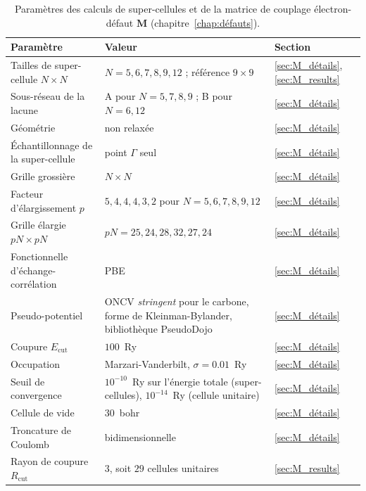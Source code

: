 \vspace*{\fill}
\begin{table}[htbp]
    \centering
    \caption[Paramètres des super-cellules et de la matrice $\bm M$.]{Paramètres des calculs de super-cellules et de la matrice de couplage électron-défaut $\bm M$ (chapitre~\ref{chap:défauts}).}
    \label{tab:param_M}
    \small
    \setlength{\tabcolsep}{4pt}
    \begin{tabular}{p{} p{} p{}}
        \hline\hline
        Paramètre & Valeur & Section \\
        \hline
        Tailles de super-cellule $N\times N$ & $N = 5, 6, 7, 8, 9, 12$ ; référence $9\times 9$ & \ref{sec:M_détails}, \ref{sec:M_results} \\
        Sous-réseau de la lacune & A pour $N = 5, 7, 8, 9$ ; B pour $N = 6, 12$ & \ref{sec:M_détails} \\
        Géométrie & non relaxée & \ref{sec:M_détails} \\
        Échantillonnage de la super-cellule & point $\Gamma$ seul & \ref{sec:M_détails} \\
        Grille grossière & $N\times N$ & \ref{sec:M_détails} \\
        Facteur d'élargissement $p$ & $5, 4, 4, 4, 3, 2$ pour $N = 5, 6, 7, 8, 9, 12$ & \ref{sec:M_détails} \\
        Grille élargie $pN\times pN$ & $pN = 25, 24, 28, 32, 27, 24$ & \ref{sec:M_détails} \\
        Fonctionnelle d'échange-corrélation & PBE & \ref{sec:M_détails} \\
        Pseudo-potentiel & ONCV \textit{stringent} pour le carbone, forme de Kleinman-Bylander, bibliothèque PseudoDojo & \ref{sec:M_détails} \\
        Coupure $E_\text{cut}$ & $100$~Ry & \ref{sec:M_détails} \\
        Occupation & Marzari-Vanderbilt, $\sigma = 0.01$~Ry & \ref{sec:M_détails} \\
        Seuil de convergence & $10^{-10}$~Ry sur l'énergie totale (super-cellules), $10^{-14}$~Ry (cellule unitaire) & \ref{sec:M_détails} \\
        Cellule de vide & $30$~bohr & \ref{sec:M_détails} \\
        Troncature de Coulomb & bidimensionnelle & \ref{sec:M_détails} \\
        Rayon de coupure $R_\text{cut}$ & $3$, soit $29$ cellules unitaires & \ref{sec:M_results} \\

\end{tabular}
\end{table}
